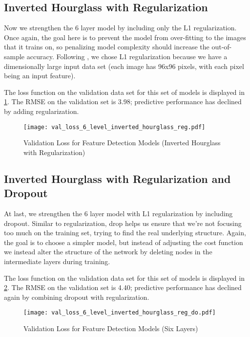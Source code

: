 \documentclass{article}
\begin{document}
\subsection{Inverted Hourglass with Regularization}

Now we strengthen the 6 layer model by including only the L1 regularization. Once again, the goal here is to prevent the model from over-fitting to the images that it trains on, so penalizing model complexity should increase the out-of-sample accuracy. Following \cite[ng2004feature]{}, we chose L1 regularization because we have a dimensionally large input data set (each image has 96x96 pixels, with each pixel being an input feature).

The loss function on the validation data set for this set of models is displayed in \ref{fig:val_loss_6_level_inverted_hourglass_reg}. The RMSE on the validation set is 3.98; predictive performance has declined by adding regularization.

\begin{figure}[!htb]
  \centering
  \caption{Validation Loss for Feature Detection Models (Inverted Hourglass with Regularization)}
  \texttt{[image: val\_loss\_6\_level\_inverted\_hourglass\_reg.pdf]}
  \label{fig:val_loss_6_level_inverted_hourglass_reg}
\end{figure}

\subsection{Inverted Hourglass with Regularization and Dropout}

At last, we strengthen the 6 layer model with L1 regularization by including dropout. Similar to regularization, drop helps us ensure that we're not focusing too much on the training set, trying to find the real underlying structure.  Again, the goal is to choose a simpler model, but instead of adjusting the cost function we instead alter the structure of the network by deleting nodes in the intermediate layers during training.

The loss function on the validation data set for this set of models is displayed in \ref{fig:val_loss_6_level_inverted_hourglass_reg_do}. The RMSE on the validation set is 4.40; predictive performance has declined again by combining dropout with regularization.

\begin{figure}[!htb]
  \centering
  \caption{Validation Loss for Feature Detection Models (Six Layers)}
  \texttt{[image: val\_loss\_6\_level\_inverted\_hourglass\_reg\_do.pdf]}
  \label{fig:val_loss_6_level_inverted_hourglass_reg_do}
\end{figure}
\end{document}
